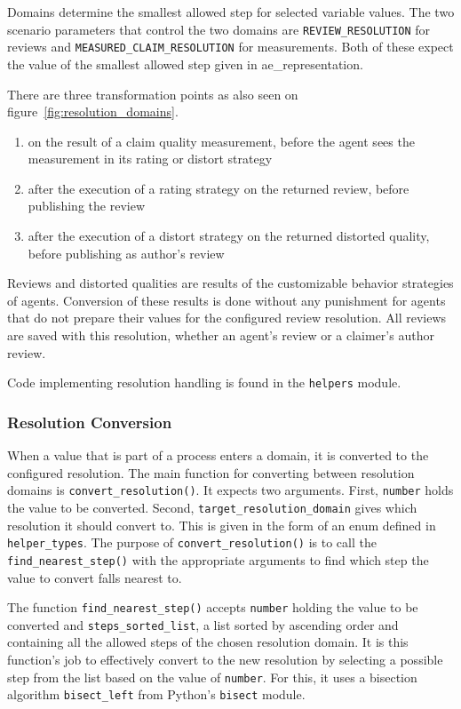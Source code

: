 \documentclass[%
    ]{\PathToTumTemplate/thesis/tum_thesis}
\begin{document}
Domains determine the smallest allowed step for selected variable values.
The two scenario parameters that control the two domains are \texttt{REVIEW\_RESOLUTION} for reviews and \texttt{MEASURED\_CLAIM\_RESOLUTION} for measurements.
Both of these expect the value of the smallest allowed step given in \gls{ae_representation}.

There are three transformation points as also seen on figure~\ref{fig:resolution_domains}.
\begin{enumerate}
    \item on the result of a claim quality measurement, before the agent sees the measurement in its rating or distort strategy
    \item after the execution of a rating strategy on the returned review, before publishing the review
    \item after the execution of a distort strategy on the returned distorted quality, before publishing as author's review
\end{enumerate}

Reviews and distorted qualities are results of the customizable behavior strategies of agents. 
Conversion of these results is done without any punishment for agents that do not prepare their values for the configured review resolution.
All reviews are saved with this resolution, whether an agent's review or a claimer's author review.

Code implementing resolution handling is found in the \texttt{helpers} module.

\subsubsection{Resolution Conversion}

When a value that is part of a process enters a domain, it is converted to the configured resolution.
The main function for converting between resolution domains is \lstinline{convert_resolution()}.
It expects two arguments.
First, \texttt{number} holds the value to be converted.
Second, \texttt{target\_resolution\_domain} gives which resolution it should convert to.
This is given in the form of an enum defined in \texttt{helper\_types}.
The purpose of \lstinline{convert_resolution()} is to call the \lstinline{find_nearest_step()} with the appropriate arguments to find which step the value to convert falls nearest to.

The function \lstinline{find_nearest_step()} accepts \texttt{number} holding the value to be converted and \texttt{steps\_sorted\_list}, a list sorted by ascending order and containing all the allowed steps of the chosen resolution domain.
It is this function's job to effectively convert to the new resolution by selecting a possible step from the list based on the value of \texttt{number}.
For this, it uses a bisection algorithm \lstinline{bisect_left} from Python's \texttt{bisect} module.
\end{document}
